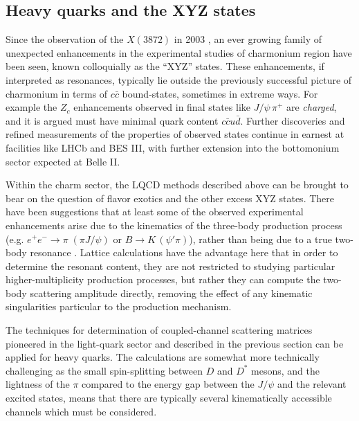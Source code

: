 \subsection{Heavy quarks and the XYZ states}

Since the  observation of the $X(3872)$ in 2003 \cite{Choi:2003ue}, an ever growing family of unexpected enhancements in the experimental studies of charmonium region have been seen, known colloquially as the ``XYZ'' states. These enhancements, if interpreted as resonances, typically lie outside the previously successful picture of charmonium in terms of $c\bar{c}$ bound-states, sometimes in extreme ways. For example the $Z_c$ enhancements observed in final states like $J/\psi \, \pi^+$ are \emph{charged}, and it is argued must have minimal quark content $c\bar{c} u \bar{d}$. Further discoveries and refined measurements of the properties of observed states continue in earnest at facilities like LHCb and BES III, with further extension into the bottomonium sector expected at Belle II.



Within the charm sector, the LQCD methods described above can be brought to bear on the question of flavor exotics and the other excess XYZ states. There have been suggestions that at least some of the observed experimental enhancements arise due to the kinematics of the three-body production process (e.g. $e^+e^- \to \pi \; (\pi J/\psi) $ or $B \to K \, (\psi' \pi)$), rather than being due to a true two-body resonance \cite{Szczepaniak:2015eza}. Lattice calculations have the advantage here that in order to determine the resonant content, they are not restricted to studying particular higher-multiplicity production processes, but rather they can compute the two-body scattering amplitude directly, removing the effect of any kinematic singularities particular to the production mechanism.


The techniques for determination of coupled-channel scattering matrices pioneered in the light-quark sector and described in the previous section can be applied for heavy quarks. The calculations are somewhat more technically challenging as the small spin-splitting between $D$ and $D^*$ mesons, and the lightness of the $\pi$ compared to the energy gap between the $J/\psi$ and the relevant excited states, means that there are typically several kinematically accessible channels which must be considered.

